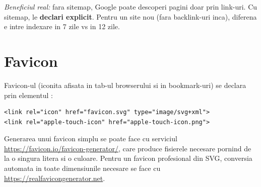 \begin{ponturi}
\emph{Beneficiul real:} fara sitemap, Google poate descoperi pagini doar prin link-uri. Cu sitemap, le \textbf{declari explicit}. Pentru un site nou (fara backlink-uri inca), diferena e intre indexare in 7 zile vs in 1\textendash{}2 zile.
\end{ponturi}

\section{Favicon}

Favicon-ul (iconita afisata in tab-ul browserului si in bookmark-uri) se declara prin elementul :

\begin{lstlisting}[style=html]
<link rel="icon" href="favicon.svg" type="image/svg+xml">
<link rel="apple-touch-icon" href="apple-touch-icon.png">
\end{lstlisting}

Generarea unui favicon simplu se poate face cu serviciul \url{https://favicon.io/favicon-generator/}, care produce fisierele necesare pornind de la o singura litera si o culoare. Pentru un favicon profesional din SVG, conversia automata in toate dimensiunile necesare se face cu \url{https://realfavicongenerator.net}.

